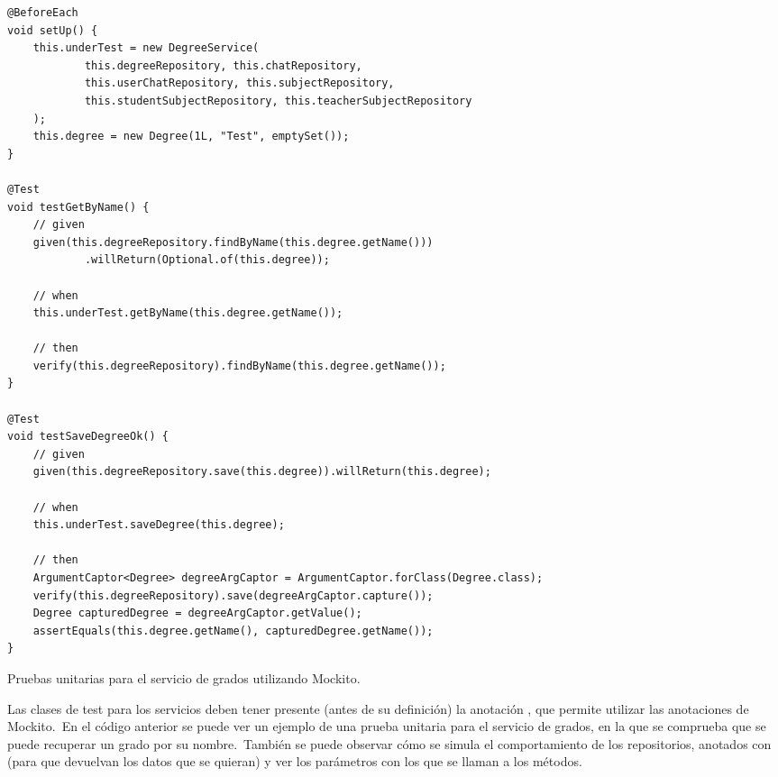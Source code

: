 \begin{itemize}
\begin{codeBlock}
\begin{verbatim}
@BeforeEach
void setUp() {
	this.underTest = new DegreeService(
			this.degreeRepository, this.chatRepository,
			this.userChatRepository, this.subjectRepository,
			this.studentSubjectRepository, this.teacherSubjectRepository
	);
	this.degree = new Degree(1L, "Test", emptySet());
}

@Test
void testGetByName() {
	// given
	given(this.degreeRepository.findByName(this.degree.getName()))
			.willReturn(Optional.of(this.degree));

	// when
	this.underTest.getByName(this.degree.getName());

	// then
	verify(this.degreeRepository).findByName(this.degree.getName());
}

@Test
void testSaveDegreeOk() {
	// given
	given(this.degreeRepository.save(this.degree)).willReturn(this.degree);

	// when
	this.underTest.saveDegree(this.degree);

	// then
	ArgumentCaptor<Degree> degreeArgCaptor = ArgumentCaptor.forClass(Degree.class);
	verify(this.degreeRepository).save(degreeArgCaptor.capture());
	Degree capturedDegree = degreeArgCaptor.getValue();
	assertEquals(this.degree.getName(), capturedDegree.getName());
}
		\end{verbatim}
		\caption{Pruebas unitarias para el servicio de grados utilizando Mockito.}
	\end{codeBlock}
	Las clases de test para los servicios deben tener presente (antes de su definición) la anotación
	, que permite utilizar las anotaciones de Mockito.\ En el
	código anterior se puede ver un ejemplo de una prueba unitaria para el servicio de grados, en la que se
	comprueba que se puede recuperar un grado por su nombre.\ También se puede observar cómo se simula el
	comportamiento de los repositorios, anotados con  (para que devuelvan los datos que se quieran)
	y ver los parámetros con los que se llaman a los métodos.
\end{itemize}
\label{itm:pruebas-unitarias-backend}


